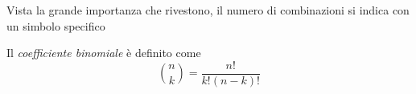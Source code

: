 Vista la grande importanza che rivestono, il numero di combinazioni si indica con un simbolo specifico

\begin{definizione}
Il \emph{coefficiente binomiale} è definito come 
$$ \binom{n}{k}=\dfrac{n!}{k!(n-k)!}$$
\end{definizione}



